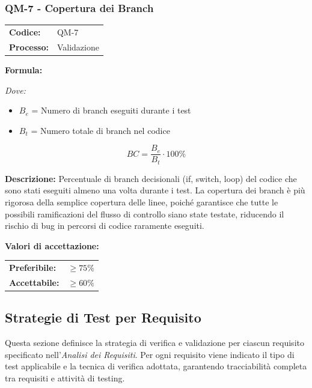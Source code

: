 \documentclass[a4paper,11pt,oneside]{scrartcl}
\begin{document}
\subsubsection{QM-7 - Copertura dei Branch}

\noindent
\begin{tabular}{@{}p{}p{}@{}}
\textbf{Codice:} & QM-7 \\
\textbf{Processo:} & Validazione \\
\end{tabular}

\vspace{0.3cm}
\noindent\textbf{Formula:}

\noindent\textit{Dove:}
\begin{itemize}[leftmargin=1.5cm, topsep=0pt, itemsep=0pt]
    \item $B_e$ = Numero di branch eseguiti durante i test
    \item $B_t$ = Numero totale di branch nel codice
\end{itemize}

\[
BC = \frac{B_e}{B_t} \cdot 100\%
\]

\noindent\textbf{Descrizione:} Percentuale di branch decisionali (if, switch, loop) del codice che sono stati eseguiti almeno una volta durante i test. La copertura dei branch è più rigorosa della semplice copertura delle linee, poiché garantisce che tutte le possibili ramificazioni del flusso di controllo siano state testate, riducendo il rischio di bug in percorsi di codice raramente eseguiti.

\vspace{0.2cm}
\noindent\textbf{Valori di accettazione:}
\vspace{0.1cm}

\noindent
\begin{tabular}{@{}ll@{}}
\textbf{Preferibile:} & $\ge 75\%$ \\
\textbf{Accettabile:} & $\ge 60\%$ \\
\end{tabular}

\subsection{Strategie di Test per Requisito}

Questa sezione definisce la strategia di verifica e validazione per ciascun requisito specificato nell'\textit{Analisi dei Requisiti}. Per ogni requisito viene indicato il tipo di test applicabile e la tecnica di verifica adottata, garantendo tracciabilità completa tra requisiti e attività di testing{\scriptsize{}}.
\end{document}
